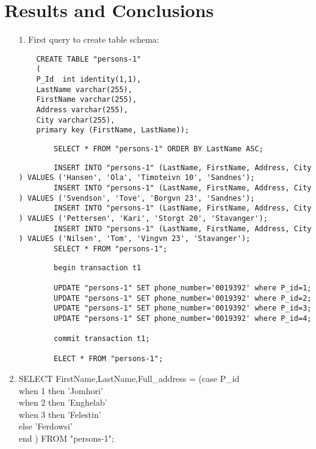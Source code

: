 \documentclass{article}
\begin{document}
\section{Results and Conclusions}
\begin{enumerate}
	\item[1.]
		First query to create table schema:
	\begin{verbatim}
	CREATE TABLE "persons-1"
	(
	P_Id  int identity(1,1),
	LastName varchar(255),
	FirstName varchar(255),
	Address varchar(255),
	City varchar(255),
	primary key (FirstName, LastName));
	\end{verbatim}

	    \begin{verbatim}
	    SELECT * FROM "persons-1" ORDER BY LastName ASC;
	    \end{verbatim}

	    \begin{verbatim}
	    INSERT INTO "persons-1" (LastName, FirstName, Address, City ) VALUES ('Hansen', 'Ola', 'Timoteivn 10', 'Sandnes');
	    INSERT INTO "persons-1" (LastName, FirstName, Address, City ) VALUES ('Svendson', 'Tove', 'Borgvn 23', 'Sandnes');
	    INSERT INTO "persons-1" (LastName, FirstName, Address, City ) VALUES ('Pettersen', 'Kari', 'Storgt 20', 'Stavanger');
	    INSERT INTO "persons-1" (LastName, FirstName, Address, City ) VALUES ('Nilsen', 'Tom', 'Vingvn 23', 'Stavanger');
	    SELECT * FROM "persons-1";
	    \end{verbatim}

	    \begin{verbatim}
	    begin transaction t1

	    UPDATE "persons-1" SET phone_number='0019392' where P_id=1;
	    UPDATE "persons-1" SET phone_number='0019392' where P_id=2;
	    UPDATE "persons-1" SET phone_number='0019392' where P_id=3;
	    UPDATE "persons-1" SET phone_number='0019392' where P_id=4;

	    commit transaction t1;

	    ELECT * FROM "persons-1";
	    \end{verbatim}

    \item %

	    SELECT  FirstName,LastName,Full\_address = (case P\_id \\
		    when 1 then 'Jomhori' \\
		    when 2 then 'Enghelab'\\
		    when 3 then 'Felestin'\\
		    else 'Ferdowsi'\\
	    end ) FROM "persons-1";\\


\end{enumerate}
\end{document}
